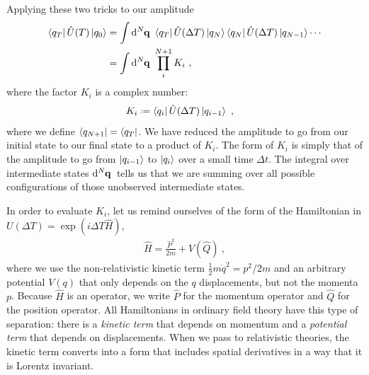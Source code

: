 \documentclass[12pt, oneside]{report}    %
\begin{document}
Applying these two tricks to our amplitude 
\begin{align}
    \bra{q_T} \hat U(T) \ket{q_0} 
    &= \int \D[N]{\vec{q}} \,
    \bra{q_T} \hat U(\Delta T) \ket{q_N}
    \bra{q_N}\hat U(\Delta T) \ket{q_{N-1}}\cdots 
    \\
    &=\int \D[N]{\vec{q}} \,
    \prod_i^{N+1} K_i \ , \label{eq:path:integral:time:evolution:product:of:Ks}
\end{align}
where the factor $K_i$ is a complex number:
\begin{align}
    K_i &\defeq \bra{q_{i}} \hat U(\Delta T) \ket{q_{i-1}} \ ,
\end{align}
where we define $\bra{q_{N+1}} = \bra{q_T}$. We have reduced the amplitude to go from our initial state to our final state to a product of $K_i$. The form of $K_i$ is simply that of the amplitude to go from $\ket{q_{i-1}}$ to $\ket{q_{i}}$ over a small time $\Delta t$. The integral over intermediate states $\D[N]{\vec{q}}$ tells us that we are summing over all possible configurations of those unobserved intermediate states. 

In order to evaluate $K_i$, let us remind ourselves of the form of the Hamiltonian in $U(\Delta T) = \exp(i\Delta T\hat H)$,
\begin{align}
    \hat H = \frac{\hat P^2}{2m} + V(\hat Q) \ ,
\end{align}
where we use the non-relativistic kinetic term $\frac{1}{2}m\dot q^2 = p^2/2m$ and an arbitrary potential $V(q)$ that only depends on the $q$ displacements, but not the momenta $p$. Because $\hat H$ is an operator, we write $\hat P$ for the momentum operator and $\hat Q$ for the position operator. All Hamiltonians in ordinary field theory have this type of separation: there is a \emph{kinetic term} that depends on momentum and a \emph{potential term} that depends on displacements. When we pass to relativistic theories, the kinetic term converts into a form that includes spatial derivatives in a way that it is Lorentz invariant. 
\end{document}
